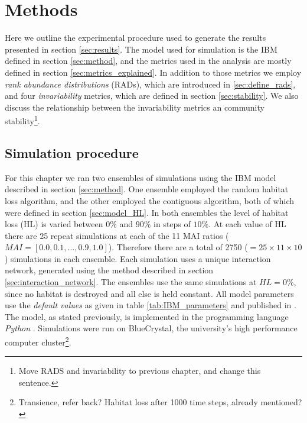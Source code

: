 

\section{Methods}
\label{sec:methods}

Here we outline the experimental procedure used to generate the results presented in section \ref{sec:results}. The model used for simulation is the IBM defined in section \ref{sec:method}, and the metrics used in the analysis are mostly defined in section \ref{sec:metrics_explained}. In addition to those metrics we employ \emph{rank abundance distributions} (RADs), which are introduced in \ref{sec:define_rads}, and four \emph{invariability} metrics, which are defined in section \ref{sec:stability}. We also discuss the relationship between the invariability metrics an community stability\footnote{Move RADS and invariability to previous chapter, and change this sentence.}.

\subsection{Simulation procedure}
\label{sec:simulation_procedure}

For this chapter we ran two ensembles of simulations using the IBM model described in section \ref{sec:method}. One ensemble employed the random habitat loss algorithm, and the other employed the contiguous algorithm, both of which were defined in section \ref{sec:model_HL}. In both ensembles the level of habitat loss (HL) is varied between $0\%$ and $90\%$ in steps of $10\%$. At each value of HL there are 25 repeat simulations at each of the 11 MAI ratios ($MAI=[0.0,0.1,...,0.9,1.0]$). Therefore there are a total of 2750 ($=25 \times 11 \times 10$) simulations in each ensemble. Each simulation uses a unique interaction network, generated using the method described in section \ref{sec:interaction_network}. The ensembles use the same simulations at $HL=0\%$, since no habitat is destroyed and all else is held constant. All model parameters use the \emph{default values} as given in table \ref{tab:IBM_parameters} and published in \cite{lurgi2015effects}. The model, as stated previously, is implemented in the programming language \emph{Python} \cite{python}. Simulations were run on BlueCrystal, the university's high performance computer cluster\footnote{Transience, refer back? Habitat loss after 1000 time steps, already mentioned?}.   

